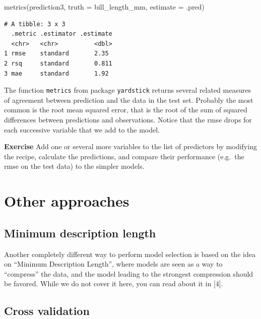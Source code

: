 \documentclass[
  letterpaper,
  DIV=11,
  numbers=noendperiod]{scrreprt}
\newenvironment{Shaded}{\begin{snugshade}}{\end{snugshade}}
\newcommand{\AttributeTok}[1]{\textcolor[rgb]{0.40,0.45,0.13}{#1}}
\newcommand{\FunctionTok}[1]{\textcolor[rgb]{0.28,0.35,0.67}{#1}}
\newcommand{\NormalTok}[1]{\textcolor[rgb]{0.00,0.23,0.31}{#1}}
\begin{document}
\begin{Shaded}
\begin{Highlighting}[]
\FunctionTok{metrics}\NormalTok{(prediction3, }\AttributeTok{truth =}\NormalTok{ bill\_length\_mm, }\AttributeTok{estimate =}\NormalTok{ .pred)}
\end{Highlighting}
\end{Shaded}

\begin{verbatim}
# A tibble: 3 x 3
  .metric .estimator .estimate
  <chr>   <chr>          <dbl>
1 rmse    standard       2.35 
2 rsq     standard       0.811
3 mae     standard       1.92 
\end{verbatim}

The function \texttt{metrics} from package \texttt{yardstick} returns
several related measures of agreement between prediction and the data in
the test set. Probably the most common is the root mean squared error,
that is the root of the sum of squared differences between predictions
and observations. Notice that the rmse drops for each successive
variable that we add to the model.

\textbf{Exercise} Add one or several more variables to the list of
predictors by modifying the recipe, calculate the predictions, and
compare their performance (e.g.~the rmse on the test data) to the
simpler models.

\hypertarget{other-approaches}{%
\section{Other approaches}\label{other-approaches}}

\hypertarget{minimum-description-length}{%
\subsection{Minimum description
length}\label{minimum-description-length}}

Another completely different way to perform model selection is based on
the idea on ``Minimum Description Length'', where models are seen as a
way to ``compress'' the data, and the model leading to the strongest
compression should be favored. While we do not cover it here, you can
read about it in {[}4{]}.

\hypertarget{cross-validation}{%
\subsection{Cross validation}\label{cross-validation}}
\end{document}
